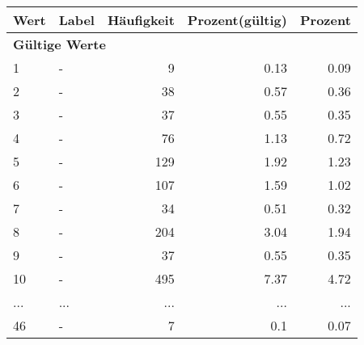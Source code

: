      \begin{longtable}{lXrrr}
     \toprule
     \textbf{Wert} & \textbf{Label} & \textbf{Häufigkeit} & \textbf{Prozent(gültig)} & \textbf{Prozent} \\
     \endhead
     \midrule
     \multicolumn{5}{l}{\textbf{Gültige Werte}}\\
        1 & \multicolumn{1}{X}{-} & %
          \num{9} &
          \num[round-mode=places,round-precision=2]{0,13} &
          \num[round-mode=places,round-precision=2]{0,09} \\
        2 & \multicolumn{1}{X}{-} & %
          \num{38} &
          \num[round-mode=places,round-precision=2]{0,57} &
          \num[round-mode=places,round-precision=2]{0,36} \\
        3 & \multicolumn{1}{X}{-} & %
          \num{37} &
          \num[round-mode=places,round-precision=2]{0,55} &
          \num[round-mode=places,round-precision=2]{0,35} \\
        4 & \multicolumn{1}{X}{-} & %
          \num{76} &
          \num[round-mode=places,round-precision=2]{1,13} &
          \num[round-mode=places,round-precision=2]{0,72} \\
        5 & \multicolumn{1}{X}{-} & %
          \num{129} &
          \num[round-mode=places,round-precision=2]{1,92} &
          \num[round-mode=places,round-precision=2]{1,23} \\
        6 & \multicolumn{1}{X}{-} & %
          \num{107} &
          \num[round-mode=places,round-precision=2]{1,59} &
          \num[round-mode=places,round-precision=2]{1,02} \\
        7 & \multicolumn{1}{X}{-} & %
          \num{34} &
          \num[round-mode=places,round-precision=2]{0,51} &
          \num[round-mode=places,round-precision=2]{0,32} \\
        8 & \multicolumn{1}{X}{-} & %
          \num{204} &
          \num[round-mode=places,round-precision=2]{3,04} &
          \num[round-mode=places,round-precision=2]{1,94} \\
        9 & \multicolumn{1}{X}{-} & %
          \num{37} &
          \num[round-mode=places,round-precision=2]{0,55} &
          \num[round-mode=places,round-precision=2]{0,35} \\
        10 & \multicolumn{1}{X}{-} & %
          \num{495} &
          \num[round-mode=places,round-precision=2]{7,37} &
          \num[round-mode=places,round-precision=2]{4,72} \\
       ... & ... & ... & ... & ... \\
        46 & \multicolumn{1}{X}{-} & %
          \num{7} &
          \num[round-mode=places,round-precision=2]{0,1} &
          \num[round-mode=places,round-precision=2]{0,07} \\


\end{longtable}
